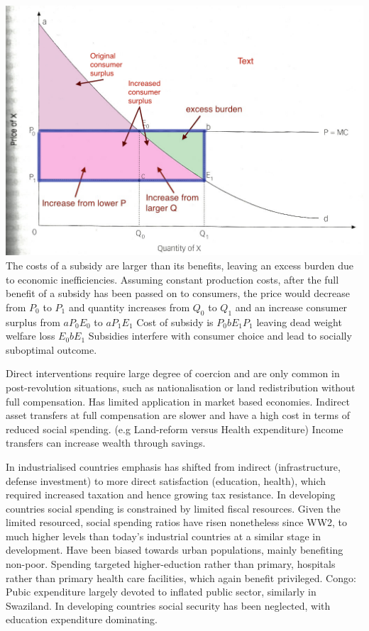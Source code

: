 \documentclass[12pt]{examnotes}
\begin{document}
\includegraphics[scale=0.3]{./imgs/82.jpg}
\ra The costs of a subsidy are larger than its benefits, leaving an excess burden due to economic inefficiencies.
\ra Assuming constant production costs, after the full benefit of a subsidy has been passed on to consumers, the price would decrease from $P_0$ to $P_1$ and quantity increases from $Q_0$ to $Q_1$ and an increase consumer surplus from $aP_0E_0$ to $aP_1E_1$
\ra Cost of subsidy is $P_0bE_1P_1$ leaving dead weight welfare loss $E_0bE_1$
\ra Subsidies interfere with consumer choice and lead to socially suboptimal outcome.

\ra Direct interventions require large degree of coercion and are only common in post-revolution situations, such as nationalisation or land redistribution without full compensation. Has limited application in market based economies. 
\ra Indirect asset transfers at full compensation are slower and have a high cost in terms of reduced social spending. (e.g Land-reform versus Health expenditure)
\ra Income transfers can increase wealth through savings.

\ra In industrialised countries emphasis has shifted from indirect (infrastructure, defense investment) to more direct satisfaction (education, health), which required increased taxation and hence growing tax resistance.
\ra In developing countries social spending is constrained by limited fiscal resources.
\ra Given the limited resourced, social spending ratios have risen nonetheless since WW2, to much higher levels than today's industrial countries at a similar stage in development.
\ra Have been biased towards urban populations, mainly benefiting non-poor.
\ra Spending targeted higher-eduction rather than primary, hospitals rather than primary health care facilities, which again benefit privileged.
\ra Congo: Pubic expenditure largely devoted to inflated public sector, similarly in Swaziland.
\ra In developing countries social security has been neglected, with education expenditure dominating.
\end{document}

